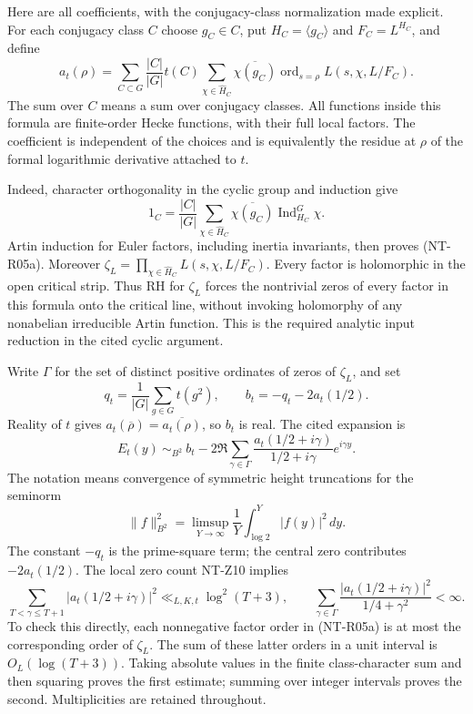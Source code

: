 \documentclass[11pt,a4paper]{article}
\begin{document}
Here are all coefficients, with the conjugacy-class normalization
made explicit. For each conjugacy class $C$ choose $g_C\in C$,
put $H_C=\langle g_C\rangle$ and $F_C=L^{H_C}$, and define
\[
 a_t(\rho)=\sum_{C\subset G}\frac{|C|}{|G|}t(C)
       \sum_{\chi\in\widehat H_C}\overline{\chi(g_C)}
             \operatorname{ord}_{s=\rho}L(s,\chi,L/F_C).
 \tag{NT-R05a}
\]
The sum over $C$ means a sum over conjugacy classes. All functions
inside this formula are finite-order Hecke functions, with their
full local factors. The coefficient is independent of the choices
and is equivalently the residue at $\rho$ of the formal logarithmic
derivative attached to $t$.

Indeed, character orthogonality in the cyclic group and induction give
\[
 1_C=\frac{|C|}{|G|}
       \sum_{\chi\in\widehat H_C}\overline{\chi(g_C)}
                \operatorname{Ind}_{H_C}^G\chi.
\]
Artin induction for Euler factors, including inertia invariants,
then proves (NT-R05a). Moreover
$\zeta_L=\prod_{\chi\in\widehat H_C}L(s,\chi,L/F_C)$.
Every factor is holomorphic in the open critical strip. Thus RH for
$\zeta_L$ forces the nontrivial zeros of every factor in this formula
onto the critical line, without invoking holomorphy of any
nonabelian irreducible Artin function. This is the required analytic
input reduction in the cited cyclic argument.

Write $\Gamma$ for the set of distinct positive ordinates of zeros
of $\zeta_L$, and set
\[
 q_t=\frac1{|G|}\sum_{g\in G}t(g^2),\qquad
 b_t=-q_t-2a_t(1/2).
\]
Reality of $t$ gives $a_t(\overline\rho)=\overline{a_t(\rho)}$,
so $b_t$ is real. The cited expansion is
\[
 E_t(y)\ \sim_{B^2}\ b_t-
       2\Re\sum_{\gamma\in\Gamma}
        \frac{a_t(1/2+i\gamma)}{1/2+i\gamma}e^{i\gamma y}.
 \tag{NT-R05b}
\]
The notation means convergence of symmetric height truncations for
the seminorm
\[
 \|f\|_{B^2}^2=\limsup_{Y\to\infty}\frac1Y
                     \int_{\log2}^Y|f(y)|^2\,dy.
\]
The constant $-q_t$ is the prime-square term; the central zero
contributes $-2a_t(1/2)$. The local zero count NT-Z10 implies
\[
 \sum_{T<\gamma\le T+1}|a_t(1/2+i\gamma)|^2
       \ll_{L,K,t}\log^2(T+3),\qquad
 \sum_{\gamma\in\Gamma}
 \frac{|a_t(1/2+i\gamma)|^2}{1/4+\gamma^2}<\infty.
 \tag{NT-R05c}
\]
To check this directly, each nonnegative factor order in
(NT-R05a) is at most the corresponding order of $\zeta_L$.
The sum of these latter orders in a unit interval is $O_L(\log(T+3))$.
Taking absolute values in the finite class-character sum and then
squaring proves the first estimate; summing over integer intervals
proves the second. Multiplicities are retained throughout.
\end{document}
